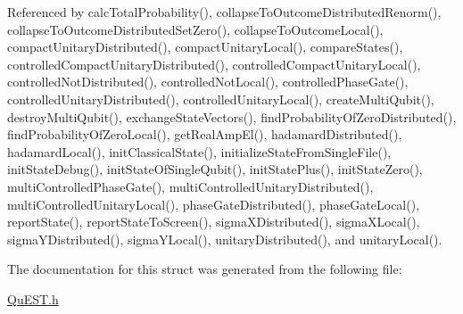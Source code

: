 Referenced by calc\+Total\+Probability(), collapse\+To\+Outcome\+Distributed\+Renorm(), collapse\+To\+Outcome\+Distributed\+Set\+Zero(), collapse\+To\+Outcome\+Local(), compact\+Unitary\+Distributed(), compact\+Unitary\+Local(), compare\+States(), controlled\+Compact\+Unitary\+Distributed(), controlled\+Compact\+Unitary\+Local(), controlled\+Not\+Distributed(), controlled\+Not\+Local(), controlled\+Phase\+Gate(), controlled\+Unitary\+Distributed(), controlled\+Unitary\+Local(), create\+Multi\+Qubit(), destroy\+Multi\+Qubit(), exchange\+State\+Vectors(), find\+Probability\+Of\+Zero\+Distributed(), find\+Probability\+Of\+Zero\+Local(), get\+Real\+Amp\+El(), hadamard\+Distributed(), hadamard\+Local(), init\+Classical\+State(), initialize\+State\+From\+Single\+File(), init\+State\+Debug(), init\+State\+Of\+Single\+Qubit(), init\+State\+Plus(), init\+State\+Zero(), multi\+Controlled\+Phase\+Gate(), multi\+Controlled\+Unitary\+Distributed(), multi\+Controlled\+Unitary\+Local(), phase\+Gate\+Distributed(), phase\+Gate\+Local(), report\+State(), report\+State\+To\+Screen(), sigma\+X\+Distributed(), sigma\+X\+Local(), sigma\+Y\+Distributed(), sigma\+Y\+Local(), unitary\+Distributed(), and unitary\+Local().



The documentation for this struct was generated from the following file\+:\begin{DoxyCompactItemize}
\item 
\mbox{\hyperlink{QuEST_8h}{Qu\+E\+S\+T.\+h}}\end{DoxyCompactItemize}
